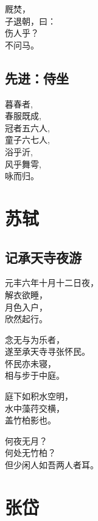 \documentclass[
]{book}
\renewenvironment{quote}{\begin{VF}}{\end{VF}}
\begin{document}
\begin{quote}
厩焚，\\
子退朝，曰：\\
伤人乎？\\
不问马。
\end{quote}

\hypertarget{section-5}{%
\section{先进：侍坐}\label{section-5}}

\begin{quote}
暮春者,\\
春服既成,\\
冠者五六人,\\
童子六七人,\\
浴乎沂,\\
风乎舞雩,\\
咏而归。
\end{quote}

\hypertarget{section-6}{%
\chapter{苏轼}\label{section-6}}

\hypertarget{section-7}{%
\section{记承天寺夜游}\label{section-7}}

\begin{quote}
元丰六年十月十二日夜，\\
解衣欲睡，\\
月色入户，\\
欣然起行。

念无与为乐者，\\
遂至承天寺寻张怀民。\\
怀民亦未寝，\\
相与步于中庭。

庭下如积水空明，\\
水中藻荇交横，\\
盖竹柏影也。

何夜无月？\\
何处无竹柏？\\
但少闲人如吾两人者耳。
\end{quote}

\hypertarget{section-8}{%
\chapter{张岱}\label{section-8}}
\end{document}
